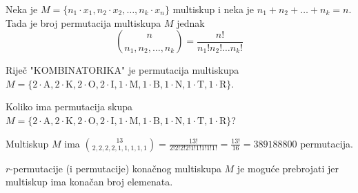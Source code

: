 \begin{theorem}
    Neka je $M = \{n_1 \cdot x_1, n_2 \cdot x_2, \dots, n_k \cdot x_n\}$
    multiskup i neka je $n_1+n_2+\dots+n_k=n$. Tada je broj permutacija
    multiskupa $M$ jednak
    $$
        \binom{n}{n_1, n_2, \dots, n_k} = \frac{n!}{n_1!n_2! \dots n_k!}
    $$
\end{theorem}

\begin{example}
    Riječ "KOMBINATORIKA" je permutacija multiskupa $M = \{2 \cdot \text{A}, 2
    \cdot \text{K}, 2 \cdot \text{O}, 2 \cdot \text{I}, 1 \cdot \text{M}, 1
    \cdot \text{B}, 1 \cdot \text{N}, 1 \cdot \text{T}, 1 \cdot \text{R} \}$.
\end{example}

\begin{example}
    Koliko ima permutacija skupa $M = \{2 \cdot \text{A}, 2 \cdot \text{K}, 2
    \cdot \text{O}, 2 \cdot \text{I}, 1 \cdot \text{M}, 1 \cdot \text{B}, 1
    \cdot \text{N}, 1 \cdot \text{T}, 1 \cdot \text{R} \}$?
\end{example}

Multiskup $M$ ima
$
\displaystyle\binom{13}{2,2,2,2,1,1,1,1,1} = \frac{13!}{2!2!2!2!1!1!1!1!1!} = \frac{13!}{16} = 389188800
$
permutacija.

\bigskip
$r$-permutacije (i permutacije) konačnog multiskupa $M$ je moguće prebrojati jer
multiskup ima konačan broj elemenata.
